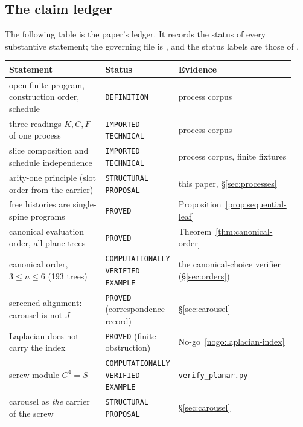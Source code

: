 
\subsection{The claim ledger}

The following table is the paper's ledger.  It records the status of every substantive
statement; the governing file is
, and the status labels are
those of .

\begin{center}
\footnotesize
\begin{longtable}{@{}>{\raggedright\arraybackslash}p{0.42\linewidth}>{\raggedright\arraybackslash}p{0.22\linewidth}>{\raggedright\arraybackslash}p{0.30\linewidth}@{}}
\toprule
Statement & Status & Evidence \\
\midrule
open finite program, construction order, schedule
  & \texttt{DEFINITION} & process corpus \cite{AdvaProcessCore2026,ProcessGeometryCore2026} \\
three readings $K,C,F$ of one process
  & \texttt{IMPORTED TECHNICAL} & process corpus \\
slice composition and schedule independence
  & \texttt{IMPORTED TECHNICAL} & process corpus, finite fixtures \\
arity-one principle (slot order from the carrier)
  & \texttt{STRUCTURAL PROPOSAL} & this paper, \S\ref{sec:processes} \\
free histories are single-spine programs
  & \texttt{PROVED} & Proposition~\ref{prop:sequential-leaf} \\
canonical evaluation order, all plane trees
  & \texttt{PROVED} & Theorem~\ref{thm:canonical-order} \\
canonical order, $3\le n\le 6$ (193 trees)
  & \texttt{COMPUTATIONALLY VERIFIED EXAMPLE} & the canonical-choice verifier (\S\ref{sec:orders}) \\
screened alignment: carousel is not $J$
  & \texttt{PROVED} (correspondence record) & \S\ref{sec:carousel} \\
Laplacian does not carry the index
  & \texttt{PROVED} (finite obstruction) & No-go~\ref{nogo:laplacian-index} \\
screw module $C^{4}=S$
  & \texttt{COMPUTATIONALLY VERIFIED EXAMPLE} & \texttt{verify\_planar.py} \\
carousel as \emph{the} carrier of the screw
  & \texttt{STRUCTURAL PROPOSAL} & \S\ref{sec:carousel} \\

\end{longtable}
\end{center}
